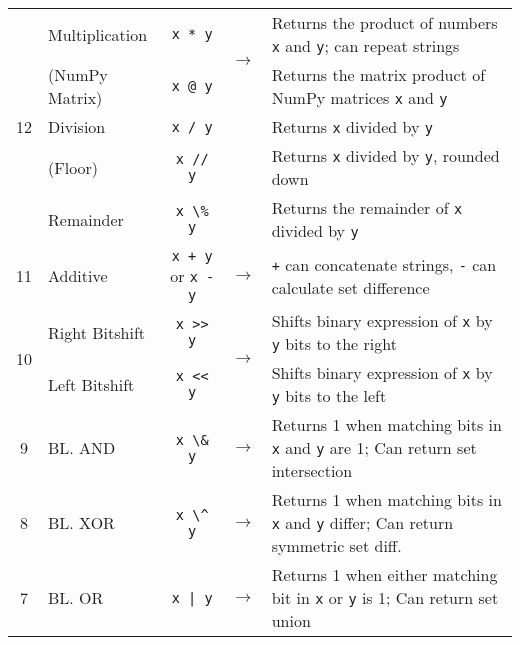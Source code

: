 \documentclass{article}
\begin{document}
\begin{center}
\begin{tabularx}{\textwidth}{clccX}
\multirow{5}{*}{12} & Multiplication & \lstinline|x * y| & \multirow{2}{*}{\(\to\)} & Returns the product of numbers \lstinline|x| and \lstinline|y|; can repeat strings\\
& (NumPy Matrix) & \lstinline|x @ y| & & Returns the matrix product of NumPy matrices \lstinline|x| and \lstinline|y|\\
& Division & \lstinline|x / y| & & Returns \lstinline|x| divided by \lstinline|y|\\
& (Floor) & \lstinline|x // y| & & Returns \lstinline|x| divided by \lstinline|y|, rounded down\\
& Remainder & \lstinline|x \% y| & & Returns the remainder of \lstinline|x| divided by \lstinline|y|\\\midrule

11 & Additive & \lstinline|x + y| or \lstinline|x - y| & \(\to\) & \lstinline|+| can concatenate strings, \lstinline|-| can calculate set difference\\\midrule

\multirow{2}{*}{10} & Right Bitshift & \lstinline|x >> y| & \multirow{2}{*}{\(\to\)} & Shifts binary expression of \lstinline|x| by \lstinline|y| bits to the right\\
& Left Bitshift & \lstinline|x << y| & & Shifts binary expression of \lstinline|x| by \lstinline|y| bits to the left\\\midrule

9 & BL. AND & \lstinline|x \& y| & \(\to\) & Returns 1 when matching bits in \lstinline|x| and \lstinline|y| are 1; Can return set intersection\\\midrule
8 & BL. XOR & \lstinline|x \^ y| & \(\to\) & Returns 1 when matching bits in \lstinline|x| and \lstinline|y| differ; Can return symmetric set diff.\\\midrule
7 & BL. OR & \lstinline+x | y+ & \(\to\) & Returns 1 when either matching bit in \lstinline|x| or \lstinline|y| is 1; Can return set union\\\midrule


\end{tabularx}
\end{center}
\end{document}
